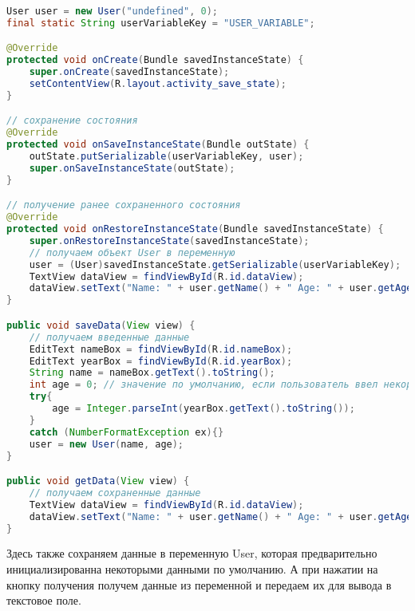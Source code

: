 \begin{lstlisting}[language=Java
	, label=lst:
	]
User user = new User("undefined", 0);
final static String userVariableKey = "USER_VARIABLE";

@Override
protected void onCreate(Bundle savedInstanceState) {
	super.onCreate(savedInstanceState);
	setContentView(R.layout.activity_save_state);
}

// сохранение состояния
@Override
protected void onSaveInstanceState(Bundle outState) {
	outState.putSerializable(userVariableKey, user);
	super.onSaveInstanceState(outState);
}

// получение ранее сохраненного состояния
@Override
protected void onRestoreInstanceState(Bundle savedInstanceState) {
	super.onRestoreInstanceState(savedInstanceState);
	// получаем объект User в переменную
	user = (User)savedInstanceState.getSerializable(userVariableKey);
	TextView dataView = findViewById(R.id.dataView);
	dataView.setText("Name: " + user.getName() + " Age: " + user.getAge());
}

public void saveData(View view) {
	// получаем введенные данные
	EditText nameBox = findViewById(R.id.nameBox);
	EditText yearBox = findViewById(R.id.yearBox);
	String name = nameBox.getText().toString();
	int age = 0; // значение по умолчанию, если пользователь ввел некорректные данные
	try{
		age = Integer.parseInt(yearBox.getText().toString());
	}
	catch (NumberFormatException ex){}
	user = new User(name, age);
}

public void getData(View view) {
	// получаем сохраненные данные
	TextView dataView = findViewById(R.id.dataView);
	dataView.setText("Name: " + user.getName() + " Age: " + user.getAge());
}
\end{lstlisting}

Здесь также сохраняем данные в переменную User, которая предварительно
инициализированна некоторыми данными по умолчанию. А при нажатии на
кнопку получения получем данные из переменной и передаем их для вывода
в текстовое поле.

